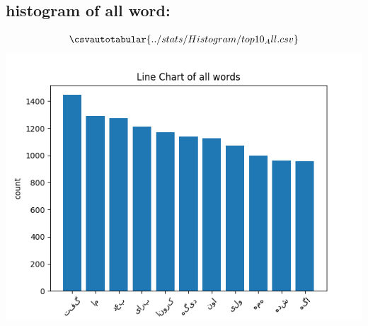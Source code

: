 \documentclass[a4paper]{article}
\begin{document}
\subsection{histogram of all word:}
\begin{align*}
	\csvautotabular{../stats/Histogram/top10_All.csv}
\end{align*} 
\includegraphics[width=1\textwidth]{../stats/Histogram/top10chartAll.png}

\pagebreak


\end{document}
